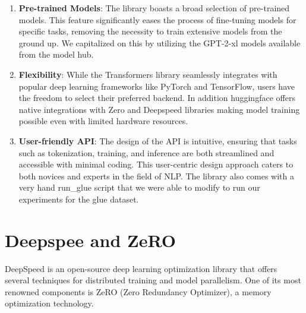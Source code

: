 \documentclass[\main/thesis.tex]{subfiles}
\begin{document}
\begin{enumerate}
    \item \textbf{Pre-trained Models}: The library boasts a broad selection of pre-trained models. This feature significantly eases the 
    process of fine-tuning models for specific tasks, removing the necessity to train extensive models from the ground up. We capitalized on this 
    by utilizing the GPT-2-xl models available from the model hub. 
    
    \item \textbf{Flexibility}: While the Transformers library seamlessly integrates with popular deep learning frameworks like 
    PyTorch and TensorFlow, users have the freedom to select their preferred backend. In addition huggingface offers native integrations with 
    Zero and Deepspeed libraries making model training possible even with limited hardware resources. 
    
    \item \textbf{User-friendly API}: The design of the API is intuitive, ensuring that tasks such as tokenization, 
    training, and inference are both streamlined and accessible with minimal coding. This user-centric design approach caters to 
    both novices and experts in the field of NLP. The library also comes with a very hand run\_glue script that we were able to modify to 
    run our experiments for the glue dataset.

\end{enumerate}


\section{Deepspee and ZeRO}\label{sec:deepspeed}

DeepSpeed\cite{rajbhandari_zero_2020} is an open-source deep learning optimization library that offers several techniques for distributed 
training and model parallelism. One of its most renowned components is ZeRO (Zero Redundancy Optimizer), a memory optimization technology.
\end{document}
